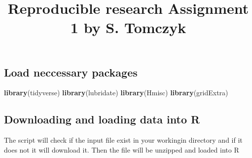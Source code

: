 \documentclass[]{article}
\title{Reproducible research Assignment 1 by S. Tomczyk}
\author{}
\date{\vspace{-2.5em}}
\newenvironment{Shaded}{\begin{snugshade}}{\end{snugshade}}
\newcommand{\ControlFlowTok}[1]{\textcolor[rgb]{0.13,0.29,0.53}{\textbf{#1}}}
\newcommand{\DataTypeTok}[1]{\textcolor[rgb]{0.13,0.29,0.53}{#1}}
\newcommand{\KeywordTok}[1]{\textcolor[rgb]{0.13,0.29,0.53}{\textbf{#1}}}
\newcommand{\NormalTok}[1]{#1}
\newcommand{\OperatorTok}[1]{\textcolor[rgb]{0.81,0.36,0.00}{\textbf{#1}}}
\newcommand{\OtherTok}[1]{\textcolor[rgb]{0.56,0.35,0.01}{#1}}
\newcommand{\StringTok}[1]{\textcolor[rgb]{0.31,0.60,0.02}{#1}}
\begin{document}
\maketitle

\hypertarget{load-neccessary-packages}{%
\subsection{Load neccessary packages}\label{load-neccessary-packages}}

\begin{Shaded}
\begin{Highlighting}[]
\KeywordTok{library}\NormalTok{(tidyverse)}
\KeywordTok{library}\NormalTok{(lubridate)}
\KeywordTok{library}\NormalTok{(Hmisc)}
\KeywordTok{library}\NormalTok{(gridExtra)}
\end{Highlighting}
\end{Shaded}

\hypertarget{downloading-and-loading-data-into-r}{%
\subsection{Downloading and loading data into
R}\label{downloading-and-loading-data-into-r}}

The script will check if the input file exist in your workingin
directory and if it does not it will download it. Then the file will be
unzipped and loaded into R

\begin{Shaded}
\end{Shaded}
\end{document}
